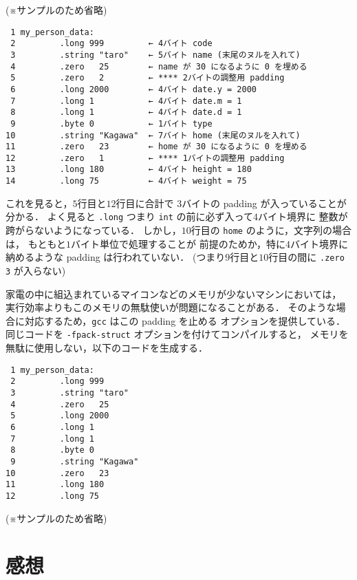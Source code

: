 \documentclass[a4j,11pt]{jarticle}
\begin{document}
(※サンプルのため省略)

{\fontsize{10pt}{11pt} \selectfont
 \begin{verbatim}
 1 my_person_data:
 2         .long 999         ← 4バイト code
 3         .string "taro"    ← 5バイト name (末尾のヌルを入れて)
 4         .zero   25        ← name が 30 になるように 0 を埋める
 5         .zero   2         ← **** 2バイトの調整用 padding
 6         .long 2000        ← 4バイト date.y = 2000
 7         .long 1           ← 4バイト date.m = 1
 8         .long 1           ← 4バイト date.d = 1
 9         .byte 0           ← 1バイト type
10         .string "Kagawa"  ← 7バイト home (末尾のヌルを入れて)
11         .zero   23        ← home が 30 になるように 0 を埋める
12         .zero   1         ← **** 1バイトの調整用 padding
13         .long 180         ← 4バイト height = 180
14         .long 75          ← 4バイト weight = 75
 \end{verbatim}
}

これを見ると，$5$行目と$12$行目に合計で
$3$バイトの padding が入っていることが分かる．
よく見ると \verb|.long| つまり \verb|int| の前に必ず入って$4$バイト境界に
整数が跨がらないようになっている．
しかし，$10$行目の \verb|home| のように，文字列の場合は，
もともと$1$バイト単位で処理することが
前提のためか，特に$4$バイト境界に納めるような padding は行われていない．
(つまり$9$行目と$10$行目の間に \verb|.zero 3| が入らない)

家電の中に組込まれているマイコンなどのメモリが少ないマシンにおいては，
実行効率よりもこのメモリの無駄使いが問題になることがある．
そのような場合に対応するため，\verb|gcc| はこの padding を止める
オプションを提供している．
同じコードを \verb|-fpack-struct| オプションを付けてコンパイルすると，
メモリを無駄に使用しない，以下のコードを生成する．

{\fontsize{10pt}{11pt} \selectfont
\begin{verbatim}
 1 my_person_data:
 2         .long 999
 3         .string "taro"
 4         .zero   25
 5         .long 2000
 6         .long 1
 7         .long 1
 8         .byte 0
 9         .string "Kagawa"
10         .zero   23
11         .long 180
12         .long 75
\end{verbatim}
}

(※サンプルのため省略)

\section{感想}
\end{document}
